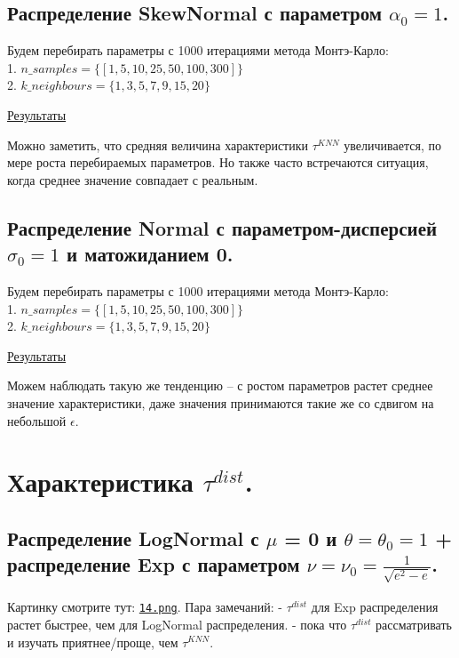 \documentclass{report}
\begin{document}
\subsection{Распределение SkewNormal с параметром $\alpha_0=1$.}
Будем перебирать параметры с 1000 итерациями метода Монтэ-Карло:\\
1. $n\_samples = \{[1, 5, 10, 25, 50, 100, 300]\}$\\
2. $k\_neighbours = \{1, 3, 5, 7, 9, 15, 20\}$

\href{https://github.com/misshimichka/dm-random-graphs/blob/dmitrii/report/report/fix_alpha_skewnorm_max_deg_knn.png}{Результаты}

Можно заметить, что средняя величина характеристики $\tau^{KNN}$ увеличивается, по мере роста перебираемых параметров. Но также часто встречаются ситуация, когда среднее значение совпадает с реальным.

\subsection{Распределение Normal с параметром-дисперсией $\sigma_0=1$ и матожиданием 0.}
Будем перебирать параметры с 1000 итерациями метода Монтэ-Карло:\\
1. $n\_samples = \{[1, 5, 10, 25, 50, 100, 300]\}$\\
2. $k\_neighbours = \{1, 3, 5, 7, 9, 15, 20\}$

\href{https://github.com/misshimichka/dm-random-graphs/blob/dmitrii/report/report/fix_sigma_norm_max_deg_knn.png}{Результаты}

Можем наблюдать такую же тенденцию -- с ростом параметров растет среднее значение характеристики, даже значения принимаются такие же со сдвигом на небольшой $\epsilon$.

\section{Характеристика $\tau^{dist}$.}
\subsection{Распределение LogNormal с $\mu$ = 0 и $\theta = \theta_0 = 1$ + распределение Exp с параметром $\nu = \nu_0 = \frac{1}{\sqrt{e^2 - e}}$.}
Картинку смотрите тут: \texttt{\href{https://github.com/misshimichka/dm-random-graphs/blob/report/report/14.png}{14.png}}.
\newline
\newline
Пара замечаний:
\newline
\newline
- $\tau^{dist}$ для Exp распределения растет быстрее, чем для LogNormal распределения.
\newline
\newline
- пока что $\tau^{dist}$ рассматривать и изучать приятнее/проще, чем $\tau^{KNN}$.
\end{document}
